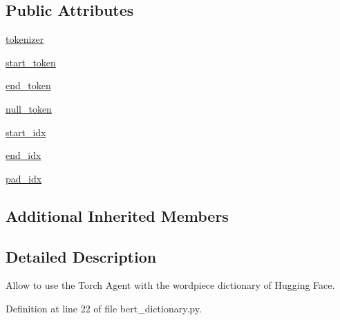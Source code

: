 \subsection*{Public Attributes}
\begin{DoxyCompactItemize}
\item 
\hyperlink{classparlai_1_1agents_1_1bert__ranker_1_1bert__dictionary_1_1BertDictionaryAgent_a255b3fa65375a03d2e74e0c2b2cc0fad}{tokenizer}
\item 
\hyperlink{classparlai_1_1agents_1_1bert__ranker_1_1bert__dictionary_1_1BertDictionaryAgent_a5b59ef24fb4aba9be417dd1c5ebd63af}{start\+\_\+token}
\item 
\hyperlink{classparlai_1_1agents_1_1bert__ranker_1_1bert__dictionary_1_1BertDictionaryAgent_a73ca2778d48882faa1bba25e33841d9c}{end\+\_\+token}
\item 
\hyperlink{classparlai_1_1agents_1_1bert__ranker_1_1bert__dictionary_1_1BertDictionaryAgent_a19f8c6b3d3954b4db246df54a4f8cb90}{null\+\_\+token}
\item 
\hyperlink{classparlai_1_1agents_1_1bert__ranker_1_1bert__dictionary_1_1BertDictionaryAgent_abbfc373c86a5d10c89b022c7082a051b}{start\+\_\+idx}
\item 
\hyperlink{classparlai_1_1agents_1_1bert__ranker_1_1bert__dictionary_1_1BertDictionaryAgent_a108b974b0f3048fc15aafd83cd0774f6}{end\+\_\+idx}
\item 
\hyperlink{classparlai_1_1agents_1_1bert__ranker_1_1bert__dictionary_1_1BertDictionaryAgent_a27aa43e578c745c4f7a340973a9e9eff}{pad\+\_\+idx}
\end{DoxyCompactItemize}
\subsection*{Additional Inherited Members}


\subsection{Detailed Description}
\begin{DoxyVerb}Allow to use the Torch Agent with the wordpiece dictionary of Hugging Face.
\end{DoxyVerb}
 

Definition at line 22 of file bert\+\_\+dictionary.\+py.



